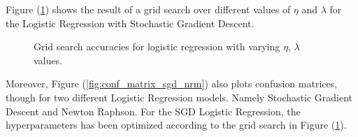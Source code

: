 \documentclass
[twocolumn,
secnumarabic,
nobibnotes,
aps,
prl,
reprint,
groupedaddress,
amsmath,
amssymb
]{revtex4-2}
\begin{document}
Figure (\ref{fig:EX_E_logreg_gridsearch}) shows the result of a grid search over different values of $\eta$ and $\lambda$ for the Logistic Regression with Stochastic Gradient Descent.
\begin{figure}
  \caption{Grid search accuracies for logistic regression with varying $\eta$, $\lambda$ values. \label{fig:EX_E_logreg_gridsearch}}
\end{figure}

Moreover, Figure (\ref{fig:conf_matrix_sgd_nrm}) also plots confusion matrices, though for two different Logistic Regression models. Namely Stochastic Gradient Descent and Newton Raphson. For the SGD Logistic Regression, the hyperparameters has been optimized according to the grid search in Figure (\ref{fig:EX_E_logreg_gridsearch}).
\end{document}
